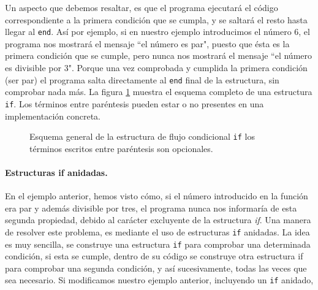 Un aspecto que debemos resaltar, es que el programa ejecutará el código correspondiente a la primera condición que se cumpla, y se saltará el resto hasta llegar al \texttt{end}. Así por ejemplo, si en nuestro ejemplo introducimos el número $6$, el programa nos mostrará el mensaje ``el número es par", puesto que ésta es la primera condición que se cumple, pero nunca nos mostrará el mensaje ``el número es divisible por 3". Porque una vez comprobada y cumplida la primera condición (ser par) el programa salta directamente al \texttt{end} final de la estructura, sin comprobar nada más. La figura \ref{fig:if} muestra el esquema completo de una estructura \texttt{if}. Los términos entre paréntesis pueden estar o no presentes en una implementación concreta.

\begin{figure}[h]
\centering
{}
\caption{Esquema general de la estructura de flujo condicional \texttt{if} los términos escritos entre paréntesis son opcionales.}
\label{fig:if}
\end{figure} 

\paragraph{Estructuras if anidadas.} 
En el ejemplo anterior, hemos visto cómo, si el número introducido en la función era par y además divisible por tres, el programa nunca nos informaría de esta segunda propiedad, debido al carácter excluyente de la estructura \emph{if}. Una manera de resolver este problema, es mediante el uso de estructuras \texttt{if} anidadas. La idea es muy sencilla, se construye una estructura \texttt{if} para comprobar una determinada condición, si esta se cumple, dentro de su código se construye otra estructura if para comprobar una segunda condición, y así sucesivamente, todas las veces que sea necesario. Si modificamos nuestro ejemplo anterior, incluyendo un \texttt{if} anidado,

